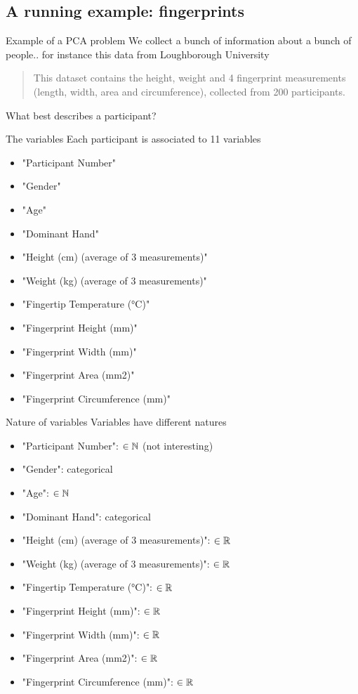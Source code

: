 \documentclass[aspectratio=169]{beamer}\usepackage[]{graphicx}\usepackage[]{xcolor}
\begin{document}
\subsection{A running example: fingerprints}
\begin{frame}{Example of a PCA problem}
We collect a bunch of information about a bunch of people.. for instance this data from Loughborough University
\vfill
\begin{quote}
This dataset contains the height, weight and 4 fingerprint measurements (length, width, area and circumference), collected from 200 participants.
\end{quote}
\vfill
What best describes a participant?
\end{frame}

\begin{frame}{The variables}
Each participant is associated to 11 variables
\vfill
\begin{itemize}
\item "Participant Number"
\item "Gender"
\item "Age"
\item "Dominant Hand"
\item "Height (cm) (average of 3 measurements)"
\item "Weight (kg) (average of 3 measurements)"
\item "Fingertip Temperature (°C)"
\item "Fingerprint Height (mm)"
\item "Fingerprint Width (mm)"
\item "Fingerprint Area (mm2)"
\item "Fingerprint Circumference (mm)"
\end{itemize}
\end{frame}

\begin{frame}{Nature of variables}
Variables have different natures
\vfill
\begin{itemize}
\item "Participant Number": $\in\mathbb{N}$ (not interesting)
\item "Gender": categorical
\item "Age": $\in\mathbb{N}$ 
\item "Dominant Hand": categorical
\item "Height (cm) (average of 3 measurements)": $\in\mathbb{R}$
\item "Weight (kg) (average of 3 measurements)": $\in\mathbb{R}$
\item "Fingertip Temperature (°C)": $\in\mathbb{R}$
\item "Fingerprint Height (mm)": $\in\mathbb{R}$
\item "Fingerprint Width (mm)": $\in\mathbb{R}$
\item "Fingerprint Area (mm2)": $\in\mathbb{R}$
\item "Fingerprint Circumference (mm)": $\in\mathbb{R}$
\end{itemize}
\end{frame}
\end{document}
